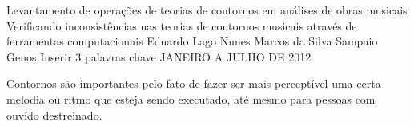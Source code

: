 \documentclass[11pt]{article}
\begin{document}
\graphicspath{{figs/}}


\dadosRelatorioFinal
{Levantamento de operações de teorias de contornos em análises de
  obras musicais}
{Verificando inconsistências nas teorias de contornos musicais através
  de ferramentas computacionais }
{Eduardo Lago Nunes}
{Marcos da Silva Sampaio}
{Genos}
{Inserir 3 palavras chave}
{JANEIRO A JULHO DE 2012}


\newpage

\setcounter{page}{1}
\onehalfspace







\label{sec:introducao}

Contornos são importantes pelo fato de fazer ser mais perceptível uma
certa melodia ou ritmo que esteja sendo executado, até mesmo para
pessoas com ouvido destreinado.

\end{document}
